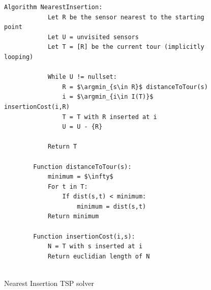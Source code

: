 \documentclass[10pt,a4paper]{article}
\DeclareMathOperator*{\argmin}{arg\,min}
\begin{document}

\begin{figure}[H]
    \begin{lstlisting}[style=mystyle]
        Algorithm NearestInsertion:
            Let R be the sensor nearest to the starting point
            Let U = unvisited sensors
            Let T = [R] be the current tour (implicitly looping)

            While U != nullset:
                R = $\argmin_{s\in R}$ distanceToTour(s) 
                i = $\argmin_{i\in I(T)}$ insertionCost(i,R)
                T = T with R inserted at i
                U = U - {R}
            
            Return T

        Function distanceToTour(s):
            minimum = $\infty$
            For t in T:
                If dist(s,t) < minimum:
                    minimum = dist(s,t)
            Return minimum
        
        Function insertionCost(i,s):
            N = T with s inserted at i
            Return euclidian length of N
        

    \end{lstlisting}
    \caption{Nearest Insertion TSP solver}
    \label{alg:ni}
\end{figure}
\end{document}
